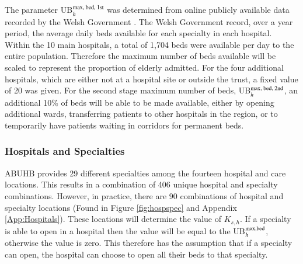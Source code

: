 \documentclass[../thesis.tex]{subfiles}
\begin{document}
The parameter UB$_{h}^{\textnormal{max, bed, 1st}}$ was determined from online publicly available data recorded by the Welsh Government \cite{StatsWales2021}. The Welsh Government record, over a year period, the average daily beds available for each specialty in each hospital. Within the 10 main hospitals, a total of 1,704 beds were available per day to the entire population. Therefore the maximum number of beds available will be scaled to represent the proportion of elderly admitted. For the four additional hospitals, which are either not at a hospital site or outside the trust, a fixed value of 20 was given. For the second stage maximum number of beds,  UB$_{h}^{\textnormal{max, bed, 2nd}}$, an additional 10\% of beds will be able to be made available, either by opening additional wards, transferring patients to other hospitals in the region, or to temporarily have patients waiting in corridors for permanent beds.

\subsubsection{Hospitals and Specialties}
ABUHB provides 29 different specialties among the fourteen hospital and care locations. This results in a combination of 406 unique hospital and specialty combinations. However, in practice, there are 90 combinations of hospital and specialty locations (Found in Figure \ref{fig:hospspec} and Appendix \ref{App:Hospitals}). These locations will determine the value of $K_{s,h}$. If a specialty is able to open in a hospital then the value will be equal to the UB$_{h}^{\textnormal{max,bed}}$, otherwise the value is zero. This therefore has the assumption that if a specialty can open, the hospital can choose to open all their beds to that specialty.
\end{document}
